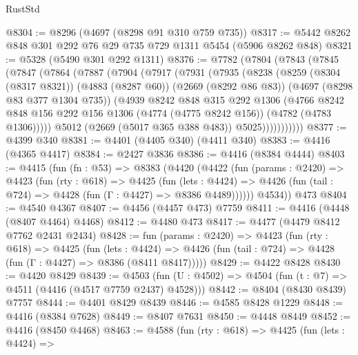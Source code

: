 \begin{lexlean}{RustStd}
\begin{coremodule}
@8304 := @8296 (@4697 (@8298 @91 @310 @759 @735))
@8317 := @5442 @8262 @848 @301 @292 @76 @29 @735 @729 @1311 @5454 (@5906 @8262 @848)
@8321 := @5328 (@5490 @301 @292 @1311)
@8376 := @7782
    (@7804
      (@7843
        (@7845
          (@7847
            (@7864
              (@7887
                (@7904
                  (@7917
                    (@7931
                      (@7935
                        (@8238
                          (@8259
                            (@8304 (@8317 @8321))
                            (@4883 (@8287 @60))
                            (@2669 (@8292 @86 @83))
                            (@4697 (@8298 @83 @377 @1304 @735))
                            (@4939
                              @8242
                              @848
                              @315
                              @292
                              @1306
                              (@4766
                                @8242
                                @848
                                @156
                                @292
                                @156
                                @1306
                                (@4774 (@4775 @8242 @156))
                                (@4782 (@4783 @1306)))))
                          @5012
                          (@2669 (@5017 @365 @388 @483))
                          @5025)))))))))))
@8377 := @4399 @340
@8381 := @4401 (@4405 @340) (@4411 @340)
@8383 := @4416 (@4365 @4417)
@8384 := @2427 @3836
@8386 := @4416 (@8384 @4444)
@8403 := @4415
    (fun (fn : @53) =>
    @8383
      (@4420
        (@4422
          (fun (params : @2420) =>
          @4423
            (fun (rty : @618) =>
            @4425
              (fun (lets : @4424) =>
              @4426 (fun (tail : @724) => @4428 (fun (Γ : @4427) => @8386 @4489))))))
        @4534))
    @473
@8404 := @4540 @4367
@8407 := @4456 (@4457 @473) @7759
@8411 := @4416 (@4448 (@8407 @4464) @4468)
@8412 := @4480 @473
@8417 := @4477 (@4479 @8412 @7762 @2431 @2434)
@8428 := fun (params : @2420) =>
  @4423
    (fun (rty : @618) =>
    @4425
      (fun (lets : @4424) =>
      @4426 (fun (tail : @724) => @4428 (fun (Γ : @4427) => @8386 (@8411 @8417)))))
@8429 := @4422 @8428
@8430 := @4420 @8429
@8439 := @4503 (fun (U : @4502) => @4504 (fun (t : @7) => @4511 (@4416 (@4517 @7759 @2437) @4528)))
@8442 := @8404 (@8430 @8439) @7757
@8444 := @4401 @8429 @8439
@8446 := @4585 @8428 @1229
@8448 := @4416 (@8384 @7628)
@8449 := @8407 @7631
@8450 := @4448 @8449
@8452 := @4416 (@8450 @4468)
@8463 := @4588
    (fun (rty : @618) =>
    @4425
      (fun (lets : @4424) =>

\end{coremodule}
\end{lexlean}
